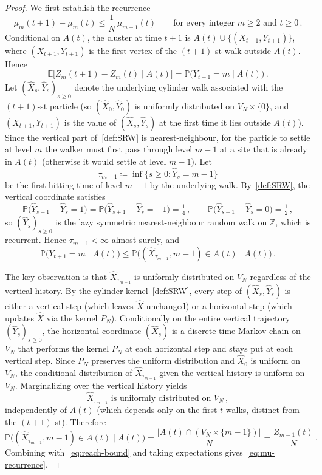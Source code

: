 \documentclass[11pt,a4paper,reqno]{amsart}
\theoremstyle{definition}
\newcommand{\bbE}{{\ensuremath{\mathbb E}} }
\newcommand{\bbP}{{\ensuremath{\mathbb P}} }
\newcommand{\bbZ}{{\ensuremath{\mathbb Z}} }
\let\m=\mu   \let\n=\nu   \let\o=\omega    \let\p=\pi  \let\ph=\varphi
\begin{document}
\begin{proof}
We first establish the recurrence
	\begin{equation}\label{eq:mu-recurrence}
	 \m_m(t+1) - \m_m(t) \leq \frac{1}{N}\, \m_{m-1}(t) \qquad \text{for every integer } m \geq 2 \text{ and } t \geq 0\,.
	\end{equation}
Conditional on $A(t)$, the cluster at time $t+1$ is $A(t) \cup \{ (X_{t+1}, Y_{t+1}) \}$, where $(X_{t+1}, Y_{t+1})$ is the first vertex of the $(t{+}1)$-st walk outside $A(t)$. Hence
	\[ \bbE\!\big[ Z_m(t+1) - Z_m(t) \mid A(t) \big] = \bbP\!\big( Y_{t+1} = m \mid A(t) \big)\,. \]
Let $(\widehat X_s, \widehat Y_s)_{s \geq 0}$ denote the underlying cylinder walk associated with the $(t{+}1)$-st particle (so $(\widehat X_0, \widehat Y_0)$ is uniformly distributed on $V_N \times \{0\}$, and $(X_{t+1}, Y_{t+1})$ is the value of $(\widehat X_s, \widehat Y_s)$ at the first time it lies outside $A(t)$). Since the vertical part of~\eqref{def:SRW} is nearest-neighbour, for the particle to settle at level $m$ the walker must first pass through level $m-1$ at a site that is already in $A(t)$ (otherwise it would settle at level $m-1$). Let
	\[ \tau_{m-1} \coloneqq \inf\{ s \geq 0 : \widehat Y_s = m-1 \} \]
be the first hitting time of level $m-1$ by the underlying walk. By~\eqref{def:SRW}, the vertical coordinate satisfies
	\[ \bbP\big(\widehat Y_{s+1} - \widehat Y_s = 1\big) = \bbP\big(\widehat Y_{s+1} - \widehat Y_s = -1\big) = \tfrac{1}{4}\,, \qquad
	\bbP\big(\widehat Y_{s+1} - \widehat Y_s = 0\big) = \tfrac{1}{2}\,, \]
so $(\widehat Y_s)_{s \geq 0}$ is the lazy symmetric nearest-neighbour random walk on $\bbZ$, which is recurrent. Hence $\tau_{m-1} < \infty$ almost surely, and
	\begin{equation}\label{eq:reach-bound}
	 \bbP\!\big( Y_{t+1} = m \mid A(t) \big) \leq \bbP\!\big( (\widehat X_{\tau_{m-1}}, m-1) \in A(t) \mid A(t) \big)\,.
	\end{equation}

The key observation is that $\widehat X_{\tau_{m-1}}$ is uniformly distributed on $V_N$ regardless of the vertical history. By the cylinder kernel~\eqref{def:SRW}, every step of $(\widehat X_s, \widehat Y_s)$ is either a vertical step (which leaves $\widehat X$ unchanged) or a horizontal step (which updates $\widehat X$ via the kernel $P_N$). Conditionally on the entire vertical trajectory $(\widehat Y_s)_{s \geq 0}$, the horizontal coordinate $(\widehat X_s)$ is a discrete-time Markov chain on $V_N$ that performs the kernel $P_N$ at each horizontal step and stays put at each vertical step. Since $P_N$ preserves the uniform distribution and $\widehat X_0$ is uniform on $V_N$, the conditional distribution of $\widehat X_{\tau_{m-1}}$ given the vertical history is uniform on $V_N$. Marginalizing over the vertical history yields
	\[ \widehat X_{\tau_{m-1}} \text{ is uniformly distributed on } V_N\,, \]
independently of $A(t)$ (which depends only on the first $t$ walks, distinct from the $(t{+}1)$-st). Therefore
	\[ \bbP\!\big( (\widehat X_{\tau_{m-1}}, m-1) \in A(t) \mid A(t) \big)
	= \frac{|A(t) \cap (V_N \times \{m-1\})|}{N}
	= \frac{Z_{m-1}(t)}{N}\,. \]
Combining with~\eqref{eq:reach-bound} and taking expectations gives~\eqref{eq:mu-recurrence}.


\end{proof}
\end{document}

